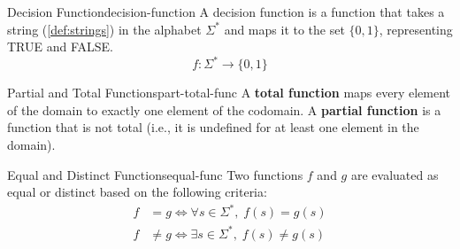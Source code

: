 \begin{definition}{Decision Function}{decision-function}
    A decision function is a function that takes a string (\cref{def:strings}) in the alphabet \(\Sigma^*\) and maps it to the set \(\{0,1\}\), representing TRUE and FALSE.
    \[
        f:\Sigma^*\rightarrow\{0,1\}
    \]
\end{definition}

\begin{definition}{Partial and Total Functions}{part-total-func}
    A \textbf{total function} maps every element of the domain to exactly one element of the codomain. A \textbf{partial function} is a function that is not total (i.e., it is undefined for at least one element in the domain).
\end{definition}

\begin{definition}{Equal and Distinct Functions}{equal-func}
    Two functions \(f\) and \(g\) are evaluated as equal or distinct based on the following criteria:
    \begin{align}
        f &= g \iff \forall s \in \Sigma^*, \; f(s) = g(s) \\
        f &\neq g \iff \exists s \in \Sigma^*, \; f(s) \neq g(s)
    \end{align}
\end{definition}

